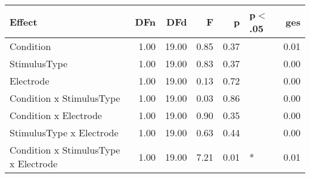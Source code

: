 \begin{table}[ht]
\centering
\begin{tabulary}{\textwidth}{lrrrrlr}
  \hline
Effect & DFn & DFd & F & p & p$<$.05 & ges \\ 
  \hline
Condition & 1.00 & 19.00 & 0.85 & 0.37 &  & 0.01 \\ 
  StimulusType & 1.00 & 19.00 & 0.83 & 0.37 &  & 0.00 \\ 
  Electrode & 1.00 & 19.00 & 0.13 & 0.72 &  & 0.00 \\ 
  Condition x StimulusType & 1.00 & 19.00 & 0.03 & 0.86 &  & 0.00 \\ 
  Condition x Electrode & 1.00 & 19.00 & 0.90 & 0.35 &  & 0.00 \\ 
  StimulusType x Electrode & 1.00 & 19.00 & 0.63 & 0.44 &  & 0.00 \\ 
  Condition x StimulusType x Electrode & 1.00 & 19.00 & 7.21 & 0.01 & * & 0.01 \\ 
   \hline
\end{tabulary}
\end{table}
